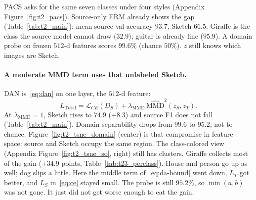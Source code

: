 \documentclass{article}
\begin{document}
PACS asks for the same seven classes under four styles (Appendix Figure~\ref{fig:t2_pacs}).
Source-only ERM already shows the gap (Table~\ref{tab:t2_main}): mean source-val accuracy $93.7$, Sketch $66.5$.
Giraffe is the class the source model cannot draw ($32.9$); guitar is already fine ($95.9$).
A domain probe on frozen $512$-d features scores $99.6\%$ (chance $50\%$).
$z$ still knows which images are Sketch.

\paragraph{A moderate MMD term uses that unlabeled Sketch.}
DAN is~\eqref{eq:dan} on one layer, the $512$-d feature:
\begin{equation}
  L_{\mathrm{Total}}
  =\mathcal{L}_{CE}(D_S)
  +\lambda_{\mathrm{MMD}}\,\widehat{\mathrm{MMD}}^2(z_S,z_T).
  \label{eq:dan-run}
\end{equation}
At $\lambda_{\mathrm{MMD}}=1$, Sketch rises to $74.9$ ($+8.3$) and source F1 does not fall (Table~\ref{tab:t2_main}).
Domain separability drops from $99.6$ to $95.2$, not to chance.
Figure~\ref{fig:t2_tsne_domain} (center) is that compromise in feature space: source and Sketch occupy the same region.
The class-colored view (Appendix Figure~\ref{fig:t2_tsne_so}, right) still has clusters.
Giraffe collects most of the gain ($+34.9$ points, Table~\ref{tab:t23_perclass}).
House and person go up as well; dog slips a little.
Here the middle term of~\eqref{eq:da-bound} went down, $L_T$ got better, and $L_S$ in~\eqref{eq:ce} stayed small.
The probe is still $95.2\%$, so $\min(a,b)$ was not gone. It just did not get worse enough to eat the gain.

\begin{table}[t]
  \centering
  \caption{PACS unsupervised DA.
  Source columns are validation Acc / macro-F1.
  Domain separability is a held-out logistic probe (chance $50\%$).
  $\Delta$Acc is Sketch accuracy minus source-only.}
  \label{tab:t2_main}
  \small\setlength{\tabcolsep}{3.5pt}
  
\end{table}
\end{document}

